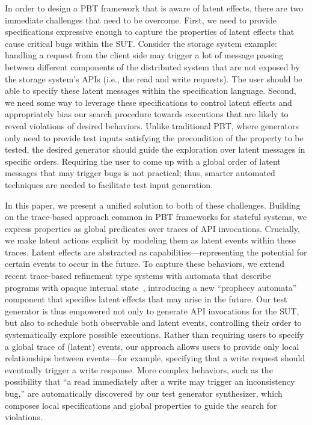 In order to design a PBT framework that is aware of latent effects, there are two immediate challenges that need to be overcome. First, we need to provide specifications expressive enough to capture the properties of latent effects that cause critical bugs within the SUT. Consider the storage system example: handling a request from the client side may trigger a lot of message passing between different components of the distributed system that are not exposed by the storage system's APIs (i.e., the read and write requests). The user should be able to specify these latent messages within the specification language.  
Second, we need some way to leverage these specifications to control latent effects and appropriately bias our search procedure towards executions that are likely to reveal violations of desired behaviors. Unlike traditional PBT, where generators only need to provide test inputs satisfying the precondition of the property to be tested, the desired generator should guide the exploration over latent messages in specific orders. Requiring the user to come up with a global order of latent messages that may trigger bugs is not practical; thus, smarter automated techniques are needed to facilitate test input generation.

In this paper, we present a unified solution to both of these challenges. Building on the trace-based approach common in PBT frameworks for stateful systems, we express properties as global predicates over traces of API invocations. Crucially, we make latent actions explicit by modeling them as latent events within these traces. Latent effects are abstracted as capabilities—representing the potential for certain events to occur in the future.
To capture these behaviors, we extend recent trace-based refinement type systems with automata that describe programs with opaque internal state~\cite{ZYDJ24}, introducing a new ``prophecy automata'' component that specifies latent effects that may arise in the future. Our test generator is thus empowered not only to generate API invocations for the SUT, but also to schedule both observable and latent events, controlling their order to systematically explore possible executions.
Rather than requiring users to specify a global trace of (latent) events, our approach allows users to provide only local relationships between events—for example, specifying that a write request should eventually trigger a write response. More complex behaviors, such as the possibility that ``a read immediately after a write may trigger an inconsistency bug,'' are automatically discovered by our test generator synthesizer, which composes local specifications and global properties to guide the search for violations.